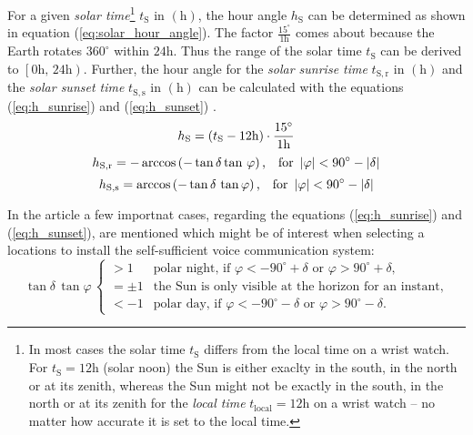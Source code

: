 For a given \emph{solar time}\footnote{In most cases the solar time $t_\mathrm{S}$ differs from the local time on a wrist watch. For $t_\mathrm{S} = 12\mathrm{h}$ (solar noon) the Sun is either exaclty in the south, in the north or at its zenith, whereas the Sun might not be exactly in the south, in the north or at its zenith for the \emph{local time} $t_\mathrm{local} = 12\mathrm{h}$ on a wrist watch -- no matter how accurate it is set to the local time.} $t_\mathrm{S}$ in $\left(\mathrm h \right)$, the hour angle $h_\mathrm{S}$ can be determined as shown in equation (\ref{eq:solar_hour_angle}). The factor $\frac{15^\circ}{1\mathrm{h}}$ comes about because the Earth rotates $360^\circ$ within $24\mathrm{h}$. Thus the range of the solar time $t_\mathrm{S}$ can be derived to $\left[0\mathrm{h} \text{, } 24\mathrm{h}\right)$. Further, the hour angle for the \emph{solar sunrise time} $t_\mathrm{S,r}$ in $\left(\mathrm h \right)$ and the \emph{solar sunset time} $t_\mathrm{S,s}$ in $\left(\mathrm h \right)$ can be calculated with the equations (\ref{eq:h_sunrise}) and (\ref{eq:h_sunset}) \cite{Landis:1995, Karttunen:2006, Mertens:2015, Wagner:2018}.
	\begin{equation} \label{eq:solar_hour_angle}
	\centering
		h_\mathrm{S} = \left(t_\mathrm{S} - 12\mathrm{h} \right) \cdot \frac{15^\circ}{1\mathrm{h}}
	\end{equation}
	\begin{equation} \label{eq:h_sunrise}
	\centering
		h_\mathrm{S,r} = - \arccos \left( -\tan \delta \tan \, \varphi \right) \text{,} \quad \text{for } \left|\varphi\right| < 90^\circ - \left|\delta\right|
	\end{equation}
	\begin{equation} \label{eq:h_sunset}
	\centering
		h_\mathrm{S,s} = \arccos \left( -\tan \delta \, \tan \varphi \right) \text{,} \quad \text{for } \left|\varphi\right| < 90^\circ - \left|\delta\right|
	\end{equation}

In the article \cite{Landis:1995} a few importnat cases, regarding the equations (\ref{eq:h_sunrise}) and (\ref{eq:h_sunset}), are mentioned which might be of interest when selecting a locations to install the self-sufficient voice communication system:
\[ \tan \delta \, \tan \varphi \,
  \begin{cases}
    > 1       	& \text{polar night, if } \varphi < -90^\circ + \delta \text{ or } \varphi > 90^\circ + \delta \text{,} \\
    = \pm 1  		& \text{the Sun is only visible at the horizon for an instant,} \\
    < -1		& \text{polar day, if } \varphi < -90^\circ - \delta \text{ or } \varphi > 90^\circ - \delta \text{.}
  \end{cases}
\]

